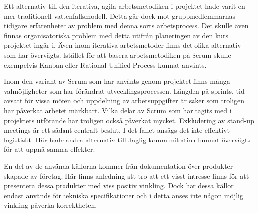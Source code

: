 Ett alternativ till den iterativa, agila arbetsmetodiken i projektet hade varit en mer traditionell vattenfallsmodell. Detta går dock mot gruppmedlemmarnas tidigare erfarenheter av problem med denna sorts arbetsprocess. Det skulle även finnas organisatoriska problem med detta utifrån planeringen av den kurs projektet ingår i. Även inom iterativa arbetsmetoder finns det olika alternativ som har övervägts. Istället för att basera arbetsmetodiken på Scrum skulle exempelvis Kanban\cite{kanban} eller Rational Unified Process\cite{RUP} kunnat använts.

Inom den variant av Scrum som har använts genom projektet finns många valmöjligheter som har förändrat utvecklingsprocessen. Längden på sprints, tid avsatt för vissa möten och uppdelning av arbetsuppgifter är saker som troligen har påverkat arbetet märkbart. Vilka delar av Scrum som har tagits med i projektets utförande har troligen också påverkat mycket. Exkludering av stand-up meetings är ett sådant centralt beslut. I det fallet ansågs det inte effektivt logistiskt. Här hade andra alternativ till daglig kommunikation kunnat övervägts för att uppnå samma effekter.

En del av de använda källorna kommer från dokumentation över produkter skapade av företag. Här finns anledning att tro att ett visst intresse finns för att presentera dessa produkter med viss positiv vinkling. Dock har dessa källor endast används för tekniska specifikationer och i detta anses inte någon möjlig vinkling påverka korrektheten.

